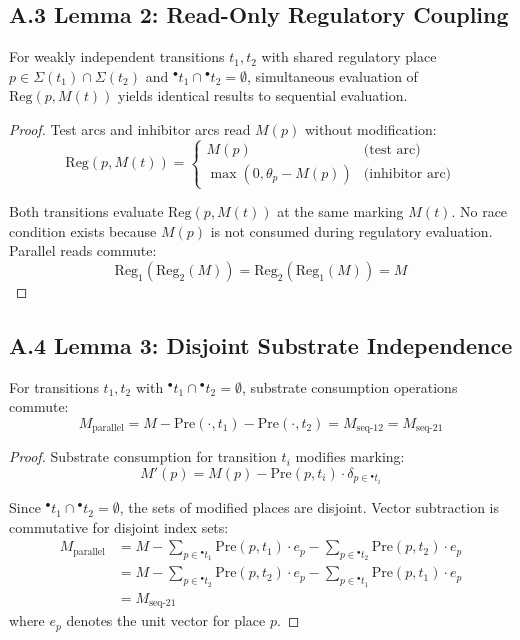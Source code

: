 \subsection*{A.3 Lemma 2: Read-Only Regulatory Coupling}

\begin{lemma}
For weakly independent transitions $t_1, t_2$ with shared regulatory place $p \in \Sigma(t_1) \cap \Sigma(t_2)$ and ${}^\bullet t_1 \cap {}^\bullet t_2 = \emptyset$, simultaneous evaluation of $\text{Reg}(p, M(t))$ yields identical results to sequential evaluation.
\end{lemma}

\begin{proof}
Test arcs and inhibitor arcs read $M(p)$ without modification:
\[
\text{Reg}(p, M(t)) = \begin{cases}
M(p) & \text{(test arc)} \\
\max(0, \theta_p - M(p)) & \text{(inhibitor arc)}
\end{cases}
\]

Both transitions evaluate $\text{Reg}(p, M(t))$ at the same marking $M(t)$. No race condition exists because $M(p)$ is not consumed during regulatory evaluation. Parallel reads commute:
\[
\text{Reg}_1(\text{Reg}_2(M)) = \text{Reg}_2(\text{Reg}_1(M)) = M
\]
\end{proof}

\subsection*{A.4 Lemma 3: Disjoint Substrate Independence}

\begin{lemma}
For transitions $t_1, t_2$ with ${}^\bullet t_1 \cap {}^\bullet t_2 = \emptyset$, substrate consumption operations commute:
\[
M_{\text{parallel}} = M - \text{Pre}(\cdot, t_1) - \text{Pre}(\cdot, t_2) = M_{\text{seq-12}} = M_{\text{seq-21}}
\]
\end{lemma}

\begin{proof}
Substrate consumption for transition $t_i$ modifies marking:
\[
M'(p) = M(p) - \text{Pre}(p, t_i) \cdot \delta_{p \in {}^\bullet t_i}
\]

Since ${}^\bullet t_1 \cap {}^\bullet t_2 = \emptyset$, the sets of modified places are disjoint. Vector subtraction is commutative for disjoint index sets:
\begin{align*}
M_{\text{parallel}} &= M - \sum_{p \in {}^\bullet t_1} \text{Pre}(p, t_1) \cdot e_p - \sum_{p \in {}^\bullet t_2} \text{Pre}(p, t_2) \cdot e_p \\
&= M - \sum_{p \in {}^\bullet t_2} \text{Pre}(p, t_2) \cdot e_p - \sum_{p \in {}^\bullet t_1} \text{Pre}(p, t_1) \cdot e_p \\
&= M_{\text{seq-21}}
\end{align*}
where $e_p$ denotes the unit vector for place $p$.
\end{proof}

